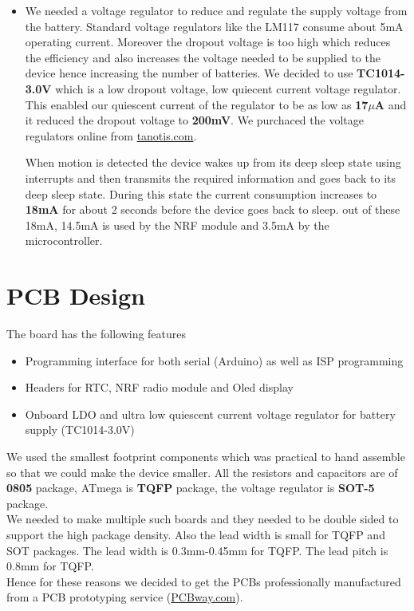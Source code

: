 \begin{itemize}
\item We needed a voltage regulator to reduce and regulate the supply voltage from the battery. Standard voltage regulators like the LM117 consume about 5mA operating current. Moreover the dropout voltage is too high which reduces the efficiency and also increases the voltage needed to be supplied to the device hence increasing the number of batteries.
We decided to use \textbf{TC1014-3.0V} which is a low dropout voltage, low quiecent current voltage regulator. This enabled our quiescent current of the regulator to be as low as \textbf{17$\mu$A} and it reduced the dropout voltage to \textbf{200mV}.
We purchaced the voltage regulators online from \url{tanotis.com}.

When motion is detected the device wakes up from its deep sleep state using interrupts and then transmits the required information and goes back to its deep sleep state. During this state the current consumption increases to \textbf{18mA} for about 2 seconds before the device goes back to sleep. out of these 18mA, 14.5mA is used by the NRF module and 3.5mA by the microcontroller.
\end{itemize}

\section{PCB Design}
The board has the following features
\begin{itemize}
	\item Programming interface for both serial (Arduino) as well as ISP programming
	\item Headers for RTC, NRF radio module and Oled display
	\item Onboard LDO and ultra low quiescent current voltage regulator for battery supply (TC1014-3.0V)
\end{itemize}

We used the smallest footprint components which was practical to hand assemble so that we could make the device smaller. All the resistors and capacitors are of \textbf{0805} package, ATmega is \textbf{TQFP} package, the voltage regulator is \textbf{SOT-5} package.
\\
We needed to make multiple such boards and they needed to be double sided to support the high package density. Also the lead width is small for TQFP and SOT packages. The lead width is 0.3mm-0.45mm for TQFP.
The lead pitch is 0.8mm for TQFP. 
\\Hence for these reasons we decided to get the PCBs professionally manufactured from a PCB prototyping service (\url{PCBway.com}).

